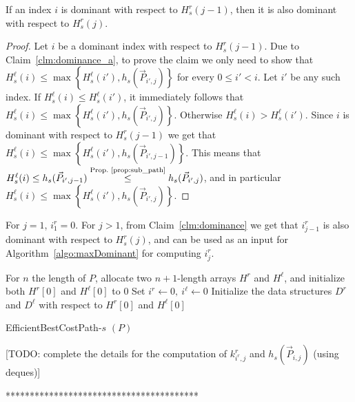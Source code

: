 \begin{claim}
	\label{clm:dominance}
	If an index $i$ is dominant with respect to $H^r_s(j-1)$, then it is also dominant with respect to  $H^r_s(j)$.
\end{claim}

\begin{proof}
	Let $i$ be a dominant index with respect to $H^r_s(j-1)$. Due to Claim~\ref{clm:dominance_a}, to prove the claim we only need to show that $H^\ell_s(i) \leq \max\left\{H^\ell_s(i'), h_s(\vec{P}_{i', j})\right\}$ for every $0 \leq i' < i$.
	Let $i'$ be any such index.
	If $H^\ell_s(i) \leq H^\ell_s(i')$, it immediately follows that $H^\ell_s(i) \leq \max\left\{H^\ell_s(i'), h_s(\vec{P}_{i', j})\right\}$.
	Otherwise  $H^\ell_s(i) > H^\ell_s(i')$. Since $i$ is dominant with respect to $H^r_s(j-1)$ we get that $H^\ell_s(i) \leq \max\left\{H^\ell_s(i'), h_s(\vec{P}_{i', j-1})\right\}$. This means that $H^\ell_s(i) \leq h_s(\vec{P}_{i', j-1}) \stackrel{\text{Prop.~\ref{prop:sub_path}}}{\leq} h_s(\vec{P}_{i', j})$, and in particular $H^\ell_s(i) \leq \max\left\{H^\ell_s(i'), h_s(\vec{P}_{i', j})\right\}$.
\end{proof}

For $j = 1$, $i^r_1 = 0$. For $j > 1$, from Claim~\ref{clm:dominance} we get that $i^r_{j-1}$ is also dominant with respect to $H^r_s(j)$, and can be used as an input for Algorithm~\ref{algo:maxDominant} for computing $i^r_j$.



\begin{algorithm}
	For $n$ the length of $P$, allocate two $n+1$-length arrays $H^r$ and $H^\ell$, and initialize both $H^r[0]$ and $H^{\ell}[0]$ to $0$\;
	Set $i^r \gets 0, \ i^\ell \gets 0$\;
	Initialize the data structures $D^r$ and $D^\ell$ with respect to $H^r[0]$ and $H^{\ell}[0]$\;
	\;
	\caption{EfficientBestCostPath-$s$ $(P)$}
	\label{algo:effH}
\end{algorithm}

[TODO: complete the details for the computation of $k^r_{i^r, j}$ and $h_s(\vec{P}_{i, j})$ (using deques)]

****************************************


